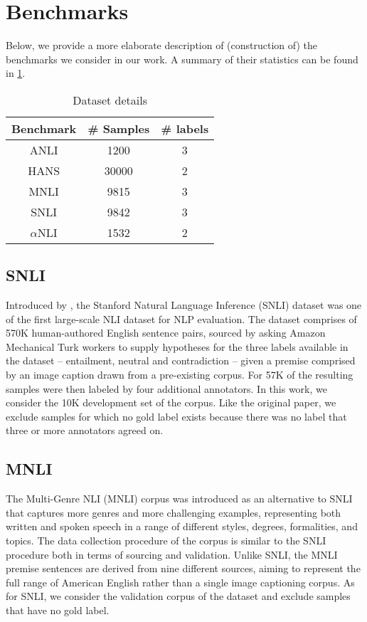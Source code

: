 \section{Benchmarks}
\label{app:benchmarks}

Below, we provide a more elaborate description of (construction of) the benchmarks we consider in our work.
A summary of their statistics can be found in \cref{tab:dataset}.

\begin{table}
\centering
\begin{tabular}{c|c|c}
    Benchmark & \# Samples & \# labels \\
    \hline
    ANLI & 1200 & 3 \\
    HANS & 30000 & 2 \\
    MNLI & 9815 & 3 \\
    SNLI & 9842 & 3 \\
    $\alpha$NLI & 1532 & 2 \\
\end{tabular}
\caption{Dataset details}
\label{tab:dataset}
\end{table}

\subsection{SNLI}
Introduced by \citet{bowman-etal-2015-large}, the Stanford Natural Language Inference (SNLI) dataset was one of the first large-scale NLI dataset for NLP evaluation.
The dataset comprises of 570K human-authored English sentence pairs, sourced by asking Amazon Mechanical Turk workers to supply hypotheses for the three labels available in the dataset -- entailment, neutral and contradiction -- given a premise comprised by an image caption drawn from a pre-existing corpus.
For 57K of the resulting samples were then labeled by four additional annotators.
In this work, we consider the 10K development set of the corpus.
Like the original paper, we exclude samples for which no gold label exists because there was no label that three or more annotators agreed on.

\subsection{MNLI}
The Multi-Genre NLI (MNLI) corpus \citep{williams-etal-2018-broad} was introduced as an alternative to SNLI that captures more genres and more challenging examples, representing both written and spoken speech in a range of different styles, degrees, formalities, and topics.
The data collection procedure of the corpus is similar to the SNLI procedure both in terms of sourcing and validation.
Unlike SNLI, the MNLI premise sentences are derived from nine different sources, aiming to represent the full range of American English rather than a single image captioning corpus.
As for SNLI, we consider the validation corpus of the dataset and exclude samples that have no gold label.

